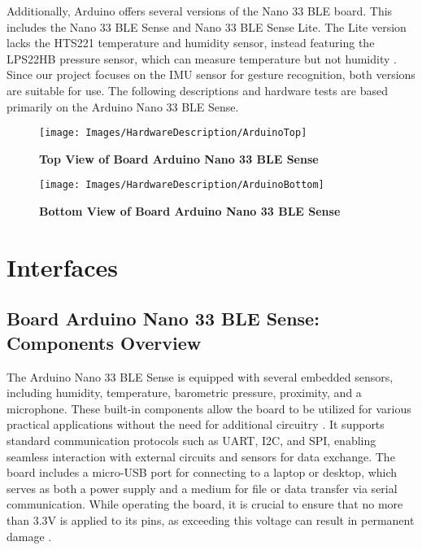 Additionally, Arduino offers several versions of the Nano 33 BLE board. This includes the Nano 33 BLE Sense and Nano 33 BLE Sense Lite. The Lite version lacks the HTS221 temperature and humidity sensor, instead featuring the LPS22HB pressure sensor, which can measure temperature but not humidity \cite{Arduino:2022}. Since our project focuses on the IMU sensor for gesture recognition, both versions are suitable for use. The following descriptions and hardware tests are based primarily on the Arduino Nano 33 BLE Sense.

\begin{figure}[h!]
	\texttt{[image: Images/HardwareDescription/ArduinoTop]}
	\caption{\textbf{Top View of Board Arduino Nano 33 BLE Sense}}
	\label{fig:Top View of Board Arduino Nano 33 BLE Sense}
	\cite{Arduino:2023}
\end{figure}

\begin{figure}[h!]
	\texttt{[image: Images/HardwareDescription/ArduinoBottom]}
	\caption{\textbf{Bottom View of Board Arduino Nano 33 BLE Sense}}
	\label{fig:Bottom View of Board Arduino Nano 33 BLE Sense} \cite{Arduino:2023}
\end{figure}


\section{Interfaces}

\subsection{Board Arduino Nano 33 BLE Sense: Components Overview}\label{BoardDescription}



The Arduino Nano 33 BLE Sense is equipped with several embedded sensors, including humidity, temperature, barometric pressure, proximity, and a microphone. These built-in components allow the board to be utilized for various practical applications without the need for additional circuitry \cite{Arduino:2021}. It supports standard communication protocols such as UART, I2C, and SPI, enabling seamless interaction with external circuits and sensors for data exchange. The board includes a micro-USB port for connecting to a laptop or desktop, which serves as both a power supply and a medium for file or data transfer via serial communication. While operating the board, it is crucial to ensure that no more than 3.3V is applied to its pins, as exceeding this voltage can result in permanent damage \cite{Arduino:2021}.

